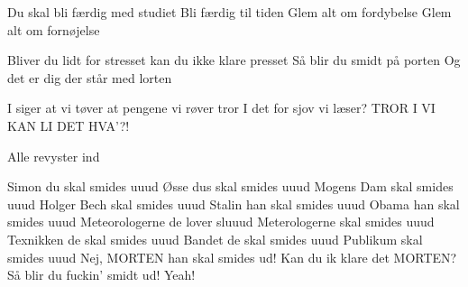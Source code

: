 \documentclass[a4paper,11pt]{article}
\begin{document}
\begin{song}
Du skal bli færdig med studiet
Bli færdig til tiden
Glem alt om fordybelse
Glem alt om fornøjelse

Bliver du lidt for stresset
kan du ikke klare presset
Så blir du smidt på porten
Og det er dig der står med lorten

I siger at vi tøver
at pengene vi røver
tror I det for sjov vi læser?
TROR I VI KAN LI DET HVA'?!

\scene Alle revyster ind

Simon du skal smides uuud
Øsse dus skal smides uuud
Mogens Dam skal smides uuud
Holger Bech skal smides uuud
Stalin han skal smides uuud
Obama han skal smides uuud
Meteorologerne de lover sluuud
Meterologerne skal smides uuud
Texnikken de skal smides uuud
Bandet de skal smides uuud
Publikum skal smides uuud
Nej, MORTEN han skal smides ud!
Kan du ik klare det MORTEN?
Så blir du fuckin' smidt ud!
Yeah!

\end{song}
\end{document}
